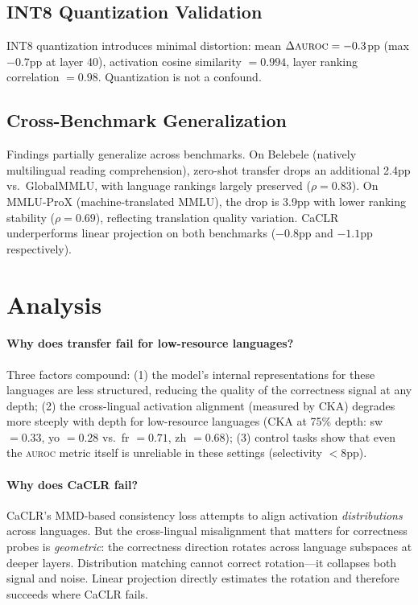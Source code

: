 \documentclass[11pt,a4paper]{article}
\newcommand{\auroc}{\textsc{auroc}}
\begin{document}
\subsection{INT8 Quantization Validation}
\label{sec:int8}

INT8 quantization introduces minimal distortion: mean $\Delta\auroc{} = -0.3$pp (max $-0.7$pp at layer 40), activation cosine similarity $= 0.994$, layer ranking correlation $= 0.98$. Quantization is not a confound.

\subsection{Cross-Benchmark Generalization}

Findings partially generalize across benchmarks. On Belebele (natively multilingual reading comprehension), zero-shot transfer drops an additional 2.4pp vs.\ GlobalMMLU, with language rankings largely preserved ($\rho = 0.83$). On MMLU-ProX (machine-translated MMLU), the drop is 3.9pp with lower ranking stability ($\rho = 0.69$), reflecting translation quality variation. CaCLR underperforms linear projection on both benchmarks ($-0.8$pp and $-1.1$pp respectively).

\section{Analysis}
\label{sec:analysis}

\paragraph{Why does transfer fail for low-resource languages?}
Three factors compound: (1) the model's internal representations for these languages are less structured, reducing the quality of the correctness signal at any depth; (2) the cross-lingual activation alignment (measured by CKA) degrades more steeply with depth for low-resource languages (CKA at 75\% depth: sw $= 0.33$, yo $= 0.28$ vs.\ fr $= 0.71$, zh $= 0.68$); (3) control tasks show that even the \auroc{} metric itself is unreliable in these settings (selectivity $< 8$pp).

\paragraph{Why does CaCLR fail?}
CaCLR's MMD-based consistency loss attempts to align activation \emph{distributions} across languages. But the cross-lingual misalignment that matters for correctness probes is \emph{geometric}: the correctness direction rotates across language subspaces at deeper layers. Distribution matching cannot correct rotation---it collapses both signal and noise. Linear projection directly estimates the rotation and therefore succeeds where CaCLR fails.
\end{document}
